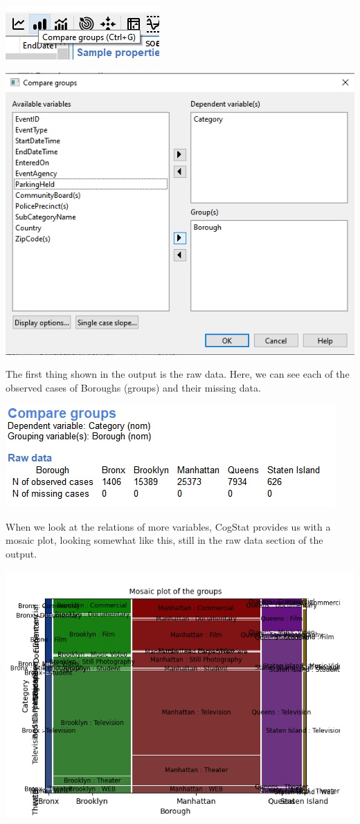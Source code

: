 \documentclass[
]{book}
\begin{document}
\includegraphics{img/ch1/comparegroups.png}

\includegraphics{img/ch1/comparegroups2.png}

The first thing shown in the output is the raw data. Here, we can see each of the observed cases of Boroughs (groups) and their missing data.

\includegraphics{img/ch1/compraw.png}

When we look at the relations of more variables, CogStat provides us with a mosaic plot, looking somewhat like this, still in the raw data section of the output.

\includegraphics{img/ch1/compare_mpsaic.png}
\end{document}
